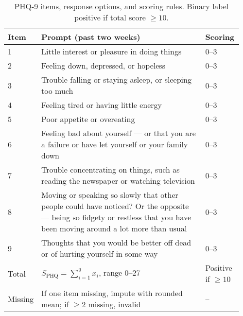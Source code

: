 \begin{table}[t]
\centering
\caption{PHQ-9 items, response options, and scoring rules. Binary label positive if total score \(\geq 10\).}
\label{tab:phq9-scoring}
\begin{tabular}{p{0.06\linewidth}p{0.74\linewidth}p{0.16\linewidth}}
\toprule
Item & Prompt (past two weeks) & Scoring \\
\midrule
1 & Little interest or pleasure in doing things & 0--3 \\
2 & Feeling down, depressed, or hopeless & 0--3 \\
3 & Trouble falling or staying asleep, or sleeping too much & 0--3 \\
4 & Feeling tired or having little energy & 0--3 \\
5 & Poor appetite or overeating & 0--3 \\
6 & Feeling bad about yourself — or that you are a failure or have let yourself or your family down & 0--3 \\
7 & Trouble concentrating on things, such as reading the newspaper or watching television & 0--3 \\
8 & Moving or speaking so slowly that other people could have noticed? Or the opposite — being so fidgety or restless that you have been moving around a lot more than usual & 0--3 \\
9 & Thoughts that you would be better off dead or of hurting yourself in some way & 0--3 \\
\midrule
Total & \(S_{\text{PHQ}} = \sum_{i=1}^{9} x_i\), range 0--27 & Positive if \(\geq 10\) \\
Missing & If one item missing, impute with rounded mean; if \(\geq 2\) missing, invalid & -- \\
\bottomrule
\end{tabular}
\end{table}


